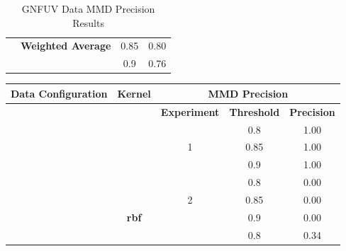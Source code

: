 \documentclass{mpaper}
\begin{document}
\begin{table}[]
\begin{tabular}{|c|ccc|}
                                                  & \multicolumn{1}{c|}{\textbf{Weighted Average}} & \multicolumn{1}{c|}{0.85}               & 0.80               \\
                                                  & \multicolumn{1}{c|}{}                          & \multicolumn{1}{c|}{0.9}                & 0.76               \\ \hline
\end{tabular}
\caption{\label{tab:gnfuv_mmd_precision}GNFUV Data MMD Precision Results}
\end{table}

\begin{table}[]
\centering
\begin{tabular}{|l|c|ccc|}
\hline
\textbf{Data   Configuration}               & \textbf{Kernel} & \multicolumn{3}{c|}{\textbf{MMD Precision}}                                                                   \\ \hline
                                            &                 & \multicolumn{1}{c|}{\textbf{Experiment}}       & \multicolumn{1}{c|}{\textbf{Threshold}} & \textbf{Precision} \\ \cline{3-5} 
                                            &                 & \multicolumn{1}{c|}{}                          & \multicolumn{1}{c|}{0.8}                & 1.00               \\
                                            &                 & \multicolumn{1}{c|}{1}                         & \multicolumn{1}{c|}{0.85}               & 1.00               \\
                                            &                 & \multicolumn{1}{c|}{}                          & \multicolumn{1}{c|}{0.9}                & 1.00               \\ \cline{3-5} 
                                            &                 & \multicolumn{1}{c|}{}                          & \multicolumn{1}{c|}{0.8}                & 0.00               \\
                                            & \textbf{}       & \multicolumn{1}{c|}{2}                         & \multicolumn{1}{c|}{0.85}               & 0.00               \\
                                            & \textbf{rbf}    & \multicolumn{1}{c|}{}                          & \multicolumn{1}{c|}{0.9}                & 0.00               \\ \cline{3-5} 
                                            &                 & \multicolumn{1}{c|}{}                          & \multicolumn{1}{c|}{0.8}                & 0.34               \\

\end{tabular}
\end{table}
\end{document}
